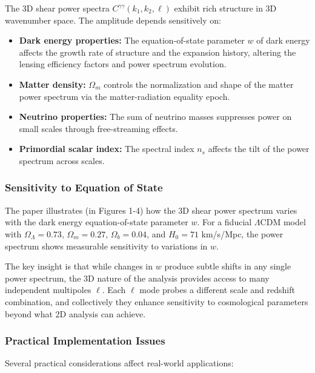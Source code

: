 The 3D shear power spectra $C^{\gamma\gamma}(k_1, k_2, \ell)$ exhibit rich structure in 3D wavenumber space. The amplitude depends sensitively on:

\begin{itemize}
\item \textbf{Dark energy properties:} The equation-of-state parameter $w$ of dark energy affects the growth rate of structure and the expansion history, altering the lensing efficiency factors and power spectrum evolution.
\item \textbf{Matter density:} $\Omega_m$ controls the normalization and shape of the matter power spectrum via the matter-radiation equality epoch.
\item \textbf{Neutrino properties:} The sum of neutrino masses suppresses power on small scales through free-streaming effects.
\item \textbf{Primordial scalar index:} The spectral index $n_s$ affects the tilt of the power spectrum across scales.
\end{itemize}

\subsubsection{Sensitivity to Equation of State}

The paper illustrates (in Figures 1-4) how the 3D shear power spectrum varies with the dark energy equation-of-state parameter $w$. For a fiducial $\Lambda$CDM model with $\Omega_\Lambda = 0.73$, $\Omega_m = 0.27$, $\Omega_b = 0.04$, and $H_0 = 71$ km/s/Mpc, the power spectrum shows measurable sensitivity to variations in $w$.

The key insight is that while changes in $w$ produce subtle shifts in any single power spectrum, the 3D nature of the analysis provides access to many independent multipoles $\ell$. Each $\ell$ mode probes a different scale and redshift combination, and collectively they enhance sensitivity to cosmological parameters beyond what 2D analysis can achieve.

\subsubsection{Practical Implementation Issues}

Several practical considerations affect real-world applications:


